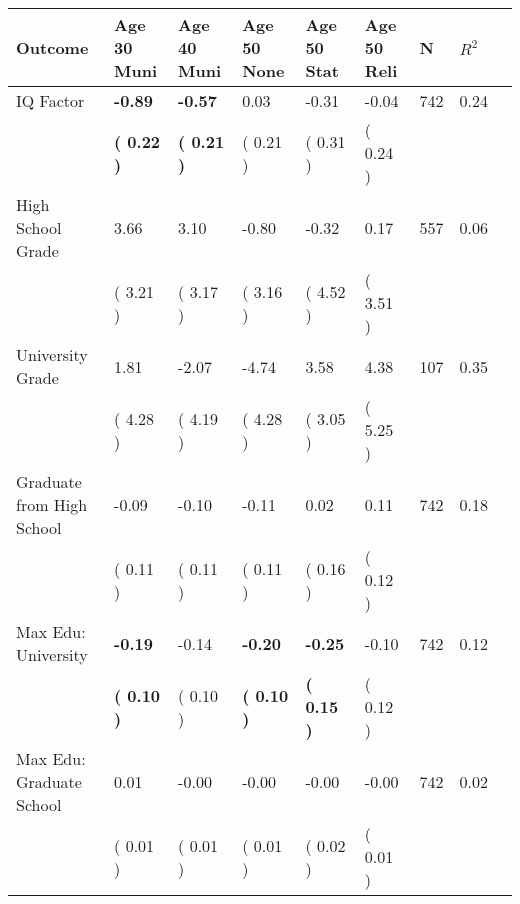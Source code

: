 \begin{tabular}{L{6.2cm} C{1.8cm} C{1.8cm} C{1.8cm} C{1.8cm} C{1.8cm} C{1.8cm} C{0.3cm} C{0.3cm}}
\toprule
 \textbf{Outcome} & \textbf{Age 30 Muni} & \textbf{Age 40 Muni} & \textbf{Age 50 None} & \textbf{Age 50 Stat} & \textbf{Age 50 Reli} & \textbf{N} & \textbf{$ R^2$} \\
\midrule
IQ Factor & \textbf{    -0.89} & \textbf{    -0.57} &      0.03 &     -0.31 &     -0.04  & 742 &       0.24 \\ 
 & \textbf{(     0.22 )} & \textbf{(     0.21 )} & (     0.21 ) & (     0.31 ) & (     0.24 )  & \\
High School Grade &      3.66 &      3.10 &     -0.80 &     -0.32 &      0.17  & 557 &       0.06 \\ 
 & (     3.21 ) & (     3.17 ) & (     3.16 ) & (     4.52 ) & (     3.51 )  & \\
University Grade &      1.81 &     -2.07 &     -4.74 &      3.58 &      4.38  & 107 &       0.35 \\ 
 & (     4.28 ) & (     4.19 ) & (     4.28 ) & (     3.05 ) & (     5.25 )  & \\
Graduate from High School &     -0.09 &     -0.10 &     -0.11 &      0.02 &      0.11  & 742 &       0.18 \\ 
 & (     0.11 ) & (     0.11 ) & (     0.11 ) & (     0.16 ) & (     0.12 )  & \\
Max Edu: University & \textbf{    -0.19} &     -0.14 & \textbf{    -0.20} & \textbf{    -0.25} &     -0.10  & 742 &       0.12 \\ 
 & \textbf{(     0.10 )} & (     0.10 ) & \textbf{(     0.10 )} & \textbf{(     0.15 )} & (     0.12 )  & \\
Max Edu: Graduate School &      0.01 &     -0.00 &     -0.00 &     -0.00 &     -0.00  & 742 &       0.02 \\ 
 & (     0.01 ) & (     0.01 ) & (     0.01 ) & (     0.02 ) & (     0.01 )  & \\
\bottomrule
\end{tabular}
